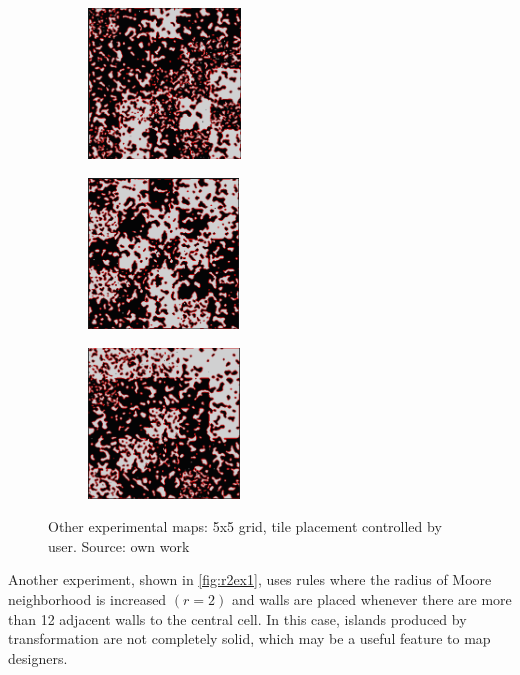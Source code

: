 \documentclass[12pt]{report}
\begin{document}
\begin{figure}[th]
	\centering
	\begin{subfigure}[t]{0.3\textwidth}
		\centering
		\includegraphics[height=4cm]{images/ex2a}
		\caption{} 
	\end{subfigure}  
	\hfill
	\begin{subfigure}[t]{0.3\textwidth}
		\centering
		\includegraphics[height=4cm]{images/ex2b}
		\caption{} 
	\end{subfigure} 
		\hfill
	\begin{subfigure}[t]{0.3\textwidth}
		\centering
		\includegraphics[height=4cm]{images/ex2c}
		\caption{} 
	\end{subfigure}
	\caption{Other experimental maps: 5x5 grid, tile placement controlled by user. Source: own work}
	\label{fig:ex2}
\end{figure}

Another experiment, shown in \cref{fig:r2ex1}, uses rules where the radius of Moore neighborhood is increased $(r = 2)$ and walls are placed whenever there are more than 12 adjacent walls to the central cell. In this case, islands produced by transformation are not completely solid, which may be a useful feature to map designers.
\end{document}
